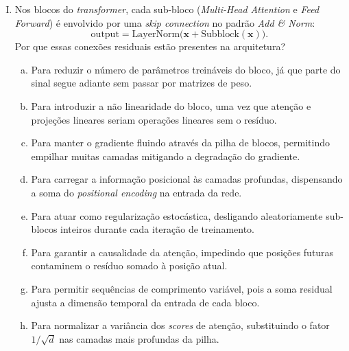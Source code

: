 \documentclass{dlproblemset}
\begin{document}
\begin{enumerate}[I)]
\begin{enumerate}[a)]
    \item $[\,1,\;-2\,]$
    \item $[\,3,\;2\,]$
    \item $[\,0,\;4\,]$
    \item $[\,1,\;2\,]$
    \item $[\,0.5,\;1\,]$
    \item $[\,2,\;1\,]$
    \item $[\,0.5,\;0\,]$
    \item $[\,1.5,\;3\,]$
\end{enumerate}

\item Nos blocos do \textit{transformer}, cada sub-bloco (\textit{Multi-Head Attention} e \textit{Feed Forward}) é envolvido por uma \textit{skip connection} no padrão \textit{Add \& Norm}:
\[
\text{output} = \mathrm{LayerNorm}\bigl(\mathbf{x} + \mathrm{Subblock}(\mathbf{x})\bigr).
\]
Por que essas conexões residuais estão presentes na arquitetura?

\begin{enumerate}[a)]
    \item Para reduzir o número de parâmetros treináveis do bloco, já que parte do sinal segue adiante sem passar por matrizes de peso.
    \item Para introduzir a não linearidade do bloco, uma vez que atenção e projeções lineares seriam operações lineares sem o resíduo.
    \item Para manter o gradiente fluindo através da pilha de blocos, permitindo empilhar muitas camadas mitigando a degradação do gradiente.
    \item Para carregar a informação posicional às camadas profundas, dispensando a soma do \textit{positional encoding} na entrada da rede.
    \item Para atuar como regularização estocástica, desligando aleatoriamente sub-blocos inteiros durante cada iteração de treinamento.
    \item Para garantir a causalidade da atenção, impedindo que posições futuras contaminem o resíduo somado à posição atual.
    \item Para permitir sequências de comprimento variável, pois a soma residual ajusta a dimensão temporal da entrada de cada bloco.
    \item Para normalizar a variância dos \textit{scores} de atenção, substituindo o fator $1/\sqrt{d}$ nas camadas mais profundas da pilha.
\end{enumerate}


\end{enumerate}
\end{document}
